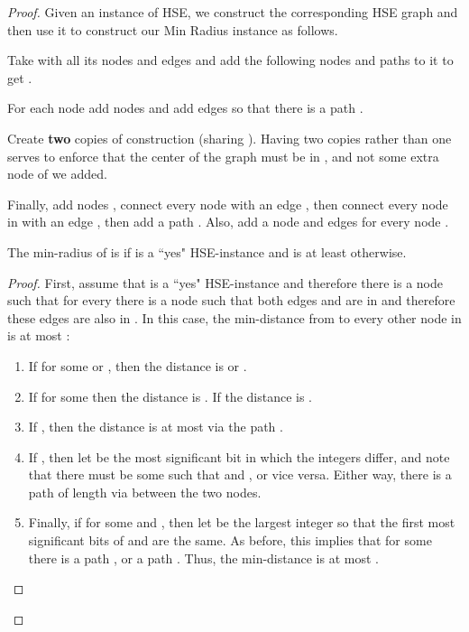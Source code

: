 \begin{proof}



Given an instance  of HSE, we construct the corresponding HSE graph  and then use it to construct our Min Radius instance  as follows.

Take  with all its nodes and edges and add the following nodes and paths to it to get .

For each node  add  nodes  and add edges so that there is a path .

Create {\bf two} copies of construction  (sharing ). Having two copies rather than one serves to enforce that the center of the graph must be in , and not some extra node of  we added.






Finally, add  nodes , connect every node  with an edge , then connect every node in  with an edge , then add a path .
Also, add a node  and edges  for every node .

\begin{claim}
The min-radius of  is  if  is a ``yes" HSE-instance and is at least  otherwise.
\end{claim}

\begin{proof}
First, assume that  is a ``yes" HSE-instance and therefore there is a node  such that for every  there is a node  such that both edges  and  are in  and therefore these edges are also in .
In this case, the min-distance from  to every other node  in  is at most :
\begin{enumerate} 
\item If  for some  or , then the distance is  or .
\item If  for some  then the distance is . If  the distance is .
\item If , then the distance is at most  via the path .
\item If , then let  be the most significant bit in which the integers  differ, and note that there must be some  such that  and , or vice versa. Either way, there is a path of length  via  between the two nodes.

\item Finally, if  for some  and , then let  be the largest integer so that the first  most significant bits of  and  are the same. As before, this implies that for some  there is a path , or a path . Thus, the min-distance is at most .

\end{enumerate}


\end{proof}
\end{proof}
